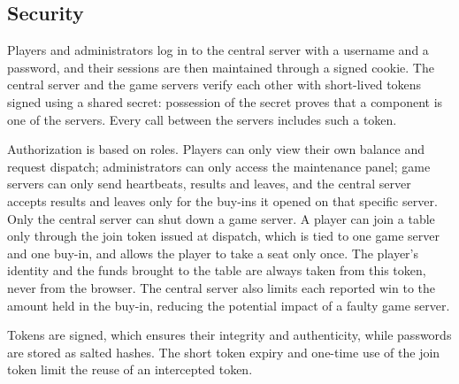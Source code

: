 \documentclass{scrartcl}
\begin{document}


\subsection{Security}\label{security}

Players and administrators log in to the central server with a username and a password, and their sessions are then maintained through a signed cookie.
The central server and the game servers verify each other with short-lived tokens signed using a shared secret: possession of the secret proves that a component is one of the servers.
Every call between the servers includes such a token.

Authorization is based on roles. Players can only view their own balance and request dispatch; administrators can only access the maintenance panel; 
game servers can only send heartbeats, results and leaves, and the central server accepts results and leaves only for the buy-ins it opened on that specific server. 
Only the central server can shut down a game server.
A player can join a table only through the join token issued at dispatch, which is tied to one game server and one buy-in, and allows the player to take a seat only once.
The player's identity and the funds brought to the table are always taken from this token, never from the browser. 
The central server also limits each reported win to the amount held in the buy-in, reducing the potential impact of a faulty game server.

Tokens are signed, which ensures their integrity and authenticity, while passwords are stored as salted hashes. 
The short token expiry and one-time use of the join token limit the reuse of an intercepted token.
\end{document}
